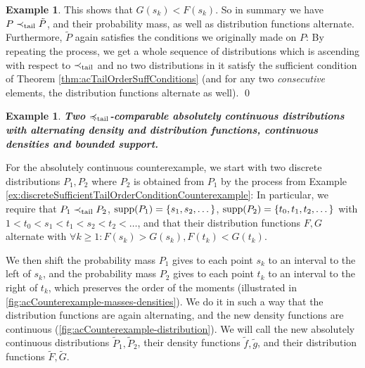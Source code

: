 \documentclass[a4paper,DIV=11]{scrreprt}
\theoremstyle{definition}
\newtheorem{ex}[thm]{Example} %
\begin{document}
\begin{ex}
        This shows that $G(s_k) < F(s_k)$. 
        So in summary we have $P \prec_{\text{tail}} \tilde{P}$, and their probability mass, as well as distribution functions alternate.
        Furthermore, $\tilde{P}$ again satisfies the conditions we originally made on $P$: By repeating the process, we get a whole sequence of distributions which is ascending with respect to $\prec_{\text{tail}}$ and no two distributions in it satisfy the sufficient condition of Theorem \ref{thm:acTailOrderSuffConditions} (and for any two \emph{consecutive} elements, the distribution functions alternate as well).
        \qed
    \end{ex}

    \begin{ex}
        \textbf{
            \textsl{Two $\preccurlyeq_{\text{tail}}$-comparable absolutely continuous distributions with alternating density and distribution functions, continuous densities and bounded support.}
        }
        
        \label{ex:acSufficientTailOrderConditionCounterexample}
        For the absolutely continuous counterexample, we start with two discrete distributions $P_1, P_2$ where $P_2$ is obtained from $P_1$ by the process from Example \ref{ex:discreteSufficientTailOrderConditionCounterexample}: In particular, we require that $P_1 \prec_{\text{tail}} P_2$, $\operatorname{supp}(P_1) = \{s_1, s_2, \dots\}$, $\operatorname{supp}(P_2) = \{t_0, t_1, t_2, \dots\}$ with $1 < t_0 < s_1 < t_1 < s_2 < t_2 < \dots$, and that their distribution functions $F, G$ alternate with $\forall k \geq 1: F(s_k) > G(s_k), F(t_k) < G(t_k)$.
        
        We then shift the probability mass $P_1$ gives to each point $s_k$ to an interval to the left of $s_k$, and the probability mass $P_2$ gives to each point $t_k$ to an interval to the right of $t_k$, which preserves the order of the moments (illustrated in \autoref{fig:acCounterexample-masses-densities}). We do it in such a way that the distribution functions are again alternating, and the new density functions are continuous (\autoref{fig:acCounterexample-distribution}). We will call the new absolutely continuous distributions $\tilde{P}_1, \tilde{P}_2$, their density functions $\tilde{f}, \tilde{g}$, and their distribution functions $\tilde{F}, \tilde{G}$.
        

\end{ex}
\end{document}
